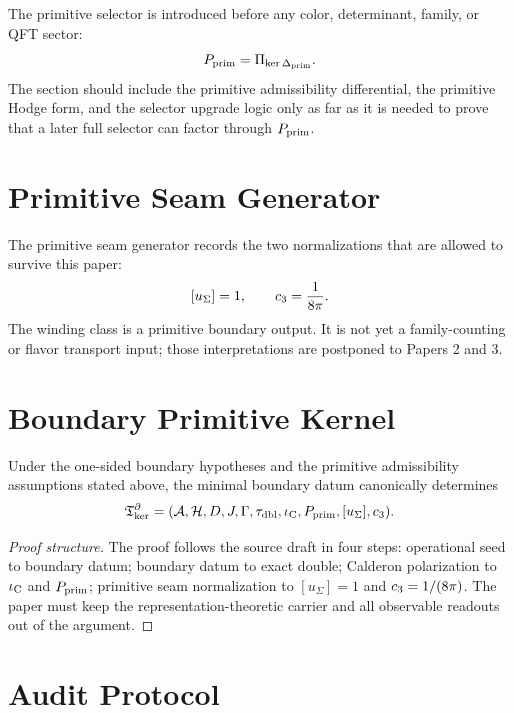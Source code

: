 \documentclass[11pt,a4paper]{article}
\begin{document}
The primitive selector is introduced before any color, determinant, family, or QFT sector:
\[
P_{\mathrm{prim}}=\Pi_{\ker\Delta_{\mathrm{prim}}}.
\]
The section should include the primitive admissibility differential, the primitive Hodge form, and
the selector upgrade logic only as far as it is needed to prove that a later full selector can
factor through $P_{\mathrm{prim}}$.

\section{Primitive Seam Generator}

The primitive seam generator records the two normalizations that are allowed to survive this paper:
\[
[u_\Sigma]=1,
\qquad
c_3=\frac{1}{8\pi}.
\]
The winding class is a primitive boundary output. It is not yet a family-counting or flavor
transport input; those interpretations are postponed to Papers 2 and 3.

\section{Boundary Primitive Kernel}

\begin{theorem}
Under the one-sided boundary hypotheses and the primitive admissibility assumptions stated above,
the minimal boundary datum canonically determines
\[
\mathfrak T_{\mathrm{ker}}^\partial
=
(\mathcal A,\mathcal H,D,J,\Gamma,\tau_{\mathrm{dbl}},\iota_{\mathrm C},P_{\mathrm{prim}},[u_\Sigma],c_3).
\]
\end{theorem}

\begin{proof}[Proof structure]
The proof follows the source draft in four steps: operational seed to boundary datum; boundary
datum to exact double; Calderon polarization to $\iota_{\mathrm C}$ and $P_{\mathrm{prim}}$; primitive seam normalization to
$[u_\Sigma]=1$ and $c_3=1/(8\pi)$. The paper must keep the representation-theoretic carrier
and all observable readouts out of the argument.
\end{proof}

\section{Audit Protocol}
\end{document}
